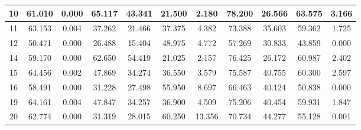 \begin{table}[]
\begin{tabular}{|c|cc|cc|cc|cc|cc|}
10 & 61.010 & \cellcolor[HTML]{EFEFEF}0.000 & 65.117 & \cellcolor[HTML]{EFEFEF}43.341 & 21.500 & \cellcolor[HTML]{EFEFEF}2.180 & 78.200 & \cellcolor[HTML]{EFEFEF}26.566 & 63.575 & \cellcolor[HTML]{EFEFEF}3.166 \\ \hline
11 & 63.153 & \cellcolor[HTML]{EFEFEF}0.004 & 37.262 & \cellcolor[HTML]{EFEFEF}21.466 & 37.375 & \cellcolor[HTML]{EFEFEF}4.382 & 73.388 & \cellcolor[HTML]{EFEFEF}35.603 & 59.362 & \cellcolor[HTML]{EFEFEF}1.725 \\ \hline
12 & 50.471 & \cellcolor[HTML]{EFEFEF}0.000 & 26.488 & \cellcolor[HTML]{EFEFEF}15.404 & 48.975 & \cellcolor[HTML]{EFEFEF}4.772 & 57.269 & \cellcolor[HTML]{EFEFEF}30.833 & 43.859 & \cellcolor[HTML]{EFEFEF}0.000 \\ \hline
14 & 59.170 & \cellcolor[HTML]{EFEFEF}0.000 & 62.650 & \cellcolor[HTML]{EFEFEF}54.419 & 21.025 & \cellcolor[HTML]{EFEFEF}2.157 & 76.425 & \cellcolor[HTML]{EFEFEF}26.172 & 60.987 & \cellcolor[HTML]{EFEFEF}2.402 \\ \hline
15 & 64.456 & \cellcolor[HTML]{EFEFEF}0.002 & 47.869 & \cellcolor[HTML]{EFEFEF}34.274 & 36.550 & \cellcolor[HTML]{EFEFEF}3.579 & 75.587 & \cellcolor[HTML]{EFEFEF}40.755 & 60.300 & \cellcolor[HTML]{EFEFEF}2.597 \\ \hline
16 & 58.491 & \cellcolor[HTML]{EFEFEF}0.000 & 31.228 & \cellcolor[HTML]{EFEFEF}27.498 & 55.950 & \cellcolor[HTML]{EFEFEF}8.697 & 66.463 & \cellcolor[HTML]{EFEFEF}40.124 & 50.838 & \cellcolor[HTML]{EFEFEF}0.000 \\ \hline
19 & 64.161 & \cellcolor[HTML]{EFEFEF}0.004 & 47.847 & \cellcolor[HTML]{EFEFEF}34.257 & 36.900 & \cellcolor[HTML]{EFEFEF}4.509 & 75.206 & \cellcolor[HTML]{EFEFEF}40.454 & 59.931 & \cellcolor[HTML]{EFEFEF}1.847 \\ \hline
20 & 62.774 & \cellcolor[HTML]{EFEFEF}0.000 & 31.319 & \cellcolor[HTML]{EFEFEF}28.015 & 60.250 & \cellcolor[HTML]{EFEFEF}13.356 & 70.734 & \cellcolor[HTML]{EFEFEF}44.277 & 55.128 & \cellcolor[HTML]{EFEFEF}0.001 \\ \hline
\end{tabular}
\end{table}
